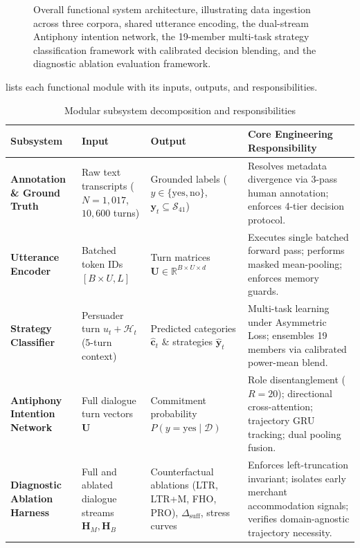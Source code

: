 \begin{figure}[htbp]
  \centering
  \resizebox{\textwidth}{!}{}
  \caption{Overall functional system architecture, illustrating data ingestion across three corpora, shared utterance encoding, the dual-stream Antiphony intention network, the 19-member multi-task strategy classification framework with calibrated decision blending, and the diagnostic ablation evaluation framework.}
  \label{fig:system_architecture}
\end{figure}

 lists each functional module with its inputs, outputs, and responsibilities.

\begin{table}[htbp]
  \centering
  \small
  \caption{Modular subsystem decomposition and responsibilities}
  \label{tab:subsystem-responsibilities}
  \begin{tabularx}{\textwidth}{l>{\hsize}Y>{\hsize}Y>{\hsize}Y}
    \toprule
    \textbf{Subsystem} & \textbf{Input} & \textbf{Output} & \textbf{Core Engineering Responsibility} \\
    \midrule
    \textbf{Annotation \& Ground Truth} & Raw text transcripts ($N=1{,}017$, $10{,}600$ turns) & Grounded labels ($y \in \{\text{yes},\text{no}\}$, $\mathbf{y}_t \subseteq \mathcal{S}_{41}$) & Resolves metadata divergence via 3-pass human annotation; enforces 4-tier decision protocol. \\
    \midrule
    \textbf{Utterance Encoder} & Batched token IDs $[B \times U, L]$ & Turn matrices $\mathbf{U} \in \mathbb{R}^{B \times U \times d}$ & Executes single batched forward pass; performs masked mean-pooling; enforces memory guards. \\
    \midrule
    \textbf{Strategy Classifier} & Persuader turn $u_t + \mathcal{H}_t$ (5-turn context) & Predicted categories $\hat{\mathbf{c}}_t$ \& strategies $\hat{\mathbf{y}}_t$ & Multi-task learning under Asymmetric Loss; ensembles 19 members via calibrated power-mean blend. \\
    \midrule
    \textbf{Antiphony Intention Network} & Full dialogue turn vectors $\mathbf{U}$ & Commitment probability $P(y = \text{yes} \mid \mathcal{D})$ & Role disentanglement ($R=20$); directional cross-attention; trajectory GRU tracking; dual pooling fusion. \\
    \midrule
    \textbf{Diagnostic Ablation Harness} & Full and ablated dialogue streams $\mathbf{H}_M, \mathbf{H}_B$ & Counterfactual ablations (LTR, LTR+M, FHO, PRO), $\Delta_{\text{suff}}$, stress curves & Enforces left-truncation invariant; isolates early merchant accommodation signals; verifies domain-agnostic trajectory necessity. \\
    \bottomrule
  \end{tabularx}
\end{table}

